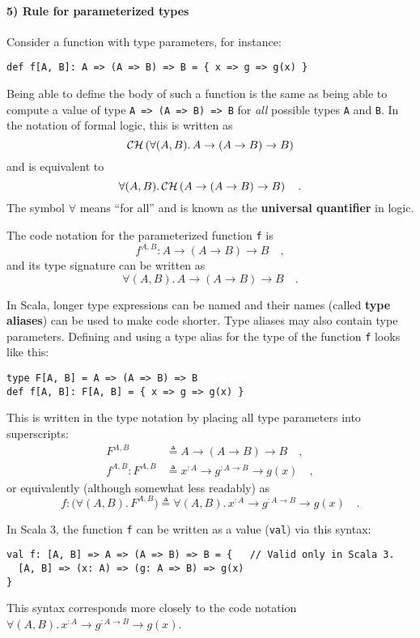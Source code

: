 \paragraph{5) Rule for parameterized types}

Consider a function with type parameters, for instance:
\begin{lstlisting}
def f[A, B]: A => (A => B) => B = { x => g => g(x) }
\end{lstlisting}
Being able to define the body of such a function is the same as being
able to compute a value of type \lstinline!A => (A => B) => B! for
\emph{all} possible types \lstinline!A! and \lstinline!B!. In the
notation of formal logic, this is written as
\[
{\cal CH}\left(\forall(A,B).\,A\rightarrow(A\rightarrow B)\rightarrow B\right)
\]
and is equivalent to
\[
\forall(A,B).\,{\cal CH}\left(A\rightarrow(A\rightarrow B)\rightarrow B\right)\quad.
\]
The symbol $\forall$ means \textsf{``}for all\textsf{''} and is known as the \textbf{universal
quantifier} in logic. 

The code notation for the parameterized function \lstinline!f! is
\[
f^{A,B}:A\rightarrow\left(A\rightarrow B\right)\rightarrow B\quad,
\]
and its type signature can be written as
\[
\forall(A,B).\,A\rightarrow\left(A\rightarrow B\right)\rightarrow B\quad.
\]

In Scala, longer type expressions can be named and their names (called
\textbf{type aliases}) can be used to make code
shorter. Type aliases may also contain type parameters. Defining and
using a type alias for the type of the function \lstinline!f! looks
like this:
\begin{lstlisting}
type F[A, B] = A => (A => B) => B
def f[A, B]: F[A, B] = { x => g => g(x) }
\end{lstlisting}
This is written in the type notation by placing all type parameters
into superscripts:
\begin{align*}
F^{A,B} & \triangleq A\rightarrow\left(A\rightarrow B\right)\rightarrow B\quad,\\
f^{A,B}:F^{A,B} & \triangleq x^{:A}\rightarrow g^{:A\rightarrow B}\rightarrow g(x)\quad,
\end{align*}
or equivalently (although somewhat less readably) as
\[
f:\big(\forall(A,B).\,F^{A,B}\big)\triangleq\forall(A,B).\,x^{:A}\rightarrow g^{:A\rightarrow B}\rightarrow g(x)\quad.
\]

In Scala 3, the function \lstinline!f! can be written as a value
(\lstinline!val!) via this syntax:
\begin{lstlisting}
val f: [A, B] => A => (A => B) => B = {   // Valid only in Scala 3.
  [A, B] => (x: A) => (g: A => B) => g(x)
}
\end{lstlisting}
This syntax corresponds more closely to the code notation $\forall(A,B).\,x^{:A}\rightarrow g^{:A\rightarrow B}\rightarrow g(x)$.

